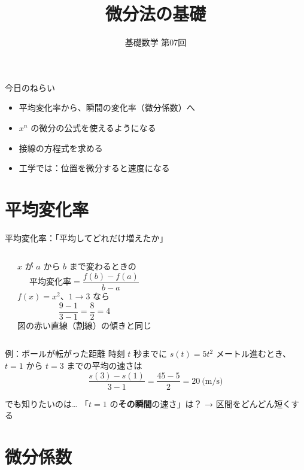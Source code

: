 \documentclass[aspectratio=169]{beamer}
\title{微分法の基礎}
\subtitle{基礎数学 第07回}
\author{}
\date{}
\begin{document}
\begin{frame}
  \titlepage
\end{frame}

\begin{frame}{今日のねらい}
  \bigskip
  \begin{itemize}
    \item 平均変化率から、瞬間の変化率（微分係数）へ
    \item $x^n$ の微分の公式を使えるようになる
    \item 接線の方程式を求める
    \item 工学では：位置を微分すると速度になる
  \end{itemize}
\end{frame}

\section{平均変化率}

\begin{frame}{平均変化率：「平均してどれだけ増えたか」}
  \begin{columns}[c]
      \begin{center}
        
      \end{center}
      $x$ が $a$ から $b$ まで変わるときの
      \[
        \text{平均変化率} = \frac{f(b) - f(a)}{b - a}
      \]
      \medskip
      $f(x) = x^2$、$1 \to 3$ なら
      \[
        \frac{9 - 1}{3 - 1} = \frac{8}{2} = 4
      \]
      \medskip
      {\small 図の赤い直線（割線）の傾きと同じ}
  \end{columns}
\end{frame}

\begin{frame}{例：ボールが転がった距離}
  \medskip
  時刻 $t$ 秒までに $s(t) = 5t^2$ メートル進むとき、$t = 1$ から $t = 3$ までの平均の速さは
  \[
    \frac{s(3) - s(1)}{3 - 1} = \frac{45 - 5}{2} = 20 \ \text{(m/s)}
  \]
  \begin{alertblock}{でも知りたいのは…}
    「$t = 1$ の\textbf{その瞬間}の速さ」は？ \quad → 区間をどんどん短くする
  \end{alertblock}
\end{frame}

\section{微分係数}
\end{document}
